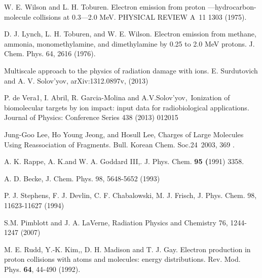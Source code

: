 \documentclass[preprint,showpacs,pra]{revtex4-1}
\begin{document}
\begin{thebibliography}{99}
W. E. Wilson and L. H. Toburen. Electron emission from
proton ---hydrocarbon-molecule collisions at 0.3---2.0 MeV. PHYSICAL REVIEW
A\ 11 1303 (1975).

D. J. Lynch, L. H. Toburen, and W. E. Wilson. Electron
emission from methane, ammonia, monomethylamine, and dimethylamine by 0.25
to 2.0 MeV protons. J. Chem. Phys. 64, 2616 (1976).

Multiscale approach to the physics of radiation
damage with ions. E. Surdutovich and A. V. Solov'yov, arXiv:1312.0897v,
(2013)

P. de Vera1, I. Abril, R. Garcia-Molina and
A.V.Solov'yov,\ Ionization of biomolecular targets by ion impact: input data
for radiobiological applications. Journal of Physics: Conference Series 438
(2013) 012015

Jung-Goo Lee, Ho Young Jeong, and Hosull Lee, Charges of
Large Molecules Using Reassociation of Fragments. Bull. Korean Chem. Soc.24\
2003, 369 .

A. K. Rappe, A. K.and W. A. Goddard III,. J. Phys. Chem. 
\textbf{95 (}1991) 3358.

A. D. Becke, 
J. Chem. Phys. 98, 5648-5652 (1993) 

P. J. Stephens, F. J. Devlin, C. F. Chabalowski, M. J. Frisch,
J. Phys. Chem. 98, 11623-11627 (1994) 

S.M. Pimblott and J. A. LaVerne, Radiation
Physics and Chemistry 76, 1244-1247 (2007)

M. E. Rudd, Y.-K. Kim,, D. H. Madison and T. J. Gay.
Electron production in proton collisions with atoms and molecules: energy
distributions. Rev. Mod. Phys. \textbf{64}, 44-490 (1992).

\end{thebibliography}
\end{document}
